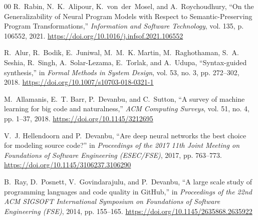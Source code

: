 \documentclass[conference]{IEEEtran}
\begin{document}
\begin{thebibliography}{00}
R.~Rabin, N.~K.~Alipour, K.~von~der~Mosel, and A.~Roychoudhury, ``On the Generalizability of Neural Program Models with Respect to Semantic-Preserving Program Transformations,'' \emph{Information and Software Technology}, vol. 135, p. 106552, 2021. \url{https://doi.org/10.1016/j.infsof.2021.106552}

R.~Alur, R.~Bodik, E.~Juniwal, M.~M.~K. Martin, M.~Raghothaman, S.~A. Seshia, R.~Singh, A.~Solar-Lezama, E.~Torlak, and A.~Udupa, ``Syntax-guided synthesis,'' in \emph{Formal Methods in System Design}, vol. 53, no. 3, pp. 272--302, 2018. \url{https://doi.org/10.1007/s10703-018-0321-1}

M.~Allamanis, E.~T. Barr, P.~Devanbu, and C.~Sutton, ``A survey of machine learning for big code and naturalness,'' \emph{ACM Computing Surveys}, vol. 51, no. 4, pp. 1--37, 2018. \url{https://doi.org/10.1145/3212695}

V.~J. Hellendoorn and P.~Devanbu, ``Are deep neural networks the best choice for modeling source code?'' in \emph{Proceedings of the 2017 11th Joint Meeting on Foundations of Software Engineering (ESEC/FSE)}, 2017, pp. 763--773. \url{https://doi.org/10.1145/3106237.3106290}

B.~Ray, D.~Posnett, V.~Govindarajulu, and P.~Devanbu, ``A large scale study of programming languages and code quality in GitHub,'' in \emph{Proceedings of the 22nd ACM SIGSOFT International Symposium on Foundations of Software Engineering (FSE)}, 2014, pp. 155--165. \url{https://doi.org/10.1145/2635868.2635922}

\end{thebibliography}
\end{document}
